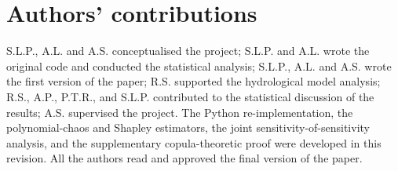 \documentclass[12pt]{article}
\begin{document}
\section*{Authors' contributions}

S.L.P., A.L. and A.S. conceptualised the project; S.L.P. and A.L. wrote the original code and conducted the statistical analysis; S.L.P., A.L. and A.S. wrote the first version of the paper; R.S. supported the hydrological model analysis; R.S., A.P., P.T.R., and S.L.P. contributed to the statistical discussion of the results; A.S. supervised the project. The Python re-implementation, the polynomial-chaos and Shapley estimators, the joint sensitivity-of-sensitivity analysis, and the supplementary copula-theoretic proof were developed in this revision. All the authors read and approved the final version of the paper.


\end{document}
